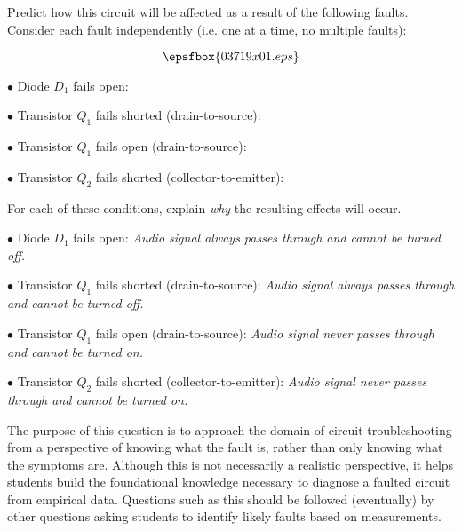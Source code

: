 

Predict how this circuit will be affected as a result of the following faults.  Consider each fault independently (i.e. one at a time, no multiple faults):

$$\epsfbox{03719x01.eps}$$

\medskip
\item{$\bullet$} Diode $D_1$ fails open:
\vskip 5pt
\item{$\bullet$} Transistor $Q_1$ fails shorted (drain-to-source):
\vskip 5pt
\item{$\bullet$} Transistor $Q_1$ fails open (drain-to-source):
\vskip 5pt
\item{$\bullet$} Transistor $Q_2$ fails shorted (collector-to-emitter):
\medskip

For each of these conditions, explain {\it why} the resulting effects will occur.







\medskip
\item{$\bullet$} Diode $D_1$ fails open: {\it Audio signal always passes through and cannot be turned off.}
\vskip 5pt
\item{$\bullet$} Transistor $Q_1$ fails shorted (drain-to-source): {\it Audio signal always passes through and cannot be turned off.}
\vskip 5pt
\item{$\bullet$} Transistor $Q_1$ fails open (drain-to-source): {\it Audio signal never passes through and cannot be turned on.}
\vskip 5pt
\item{$\bullet$} Transistor $Q_2$ fails shorted (collector-to-emitter): {\it Audio signal never passes through and cannot be turned on.}
\medskip







The purpose of this question is to approach the domain of circuit troubleshooting from a perspective of knowing what the fault is, rather than only knowing what the symptoms are.  Although this is not necessarily a realistic perspective, it helps students build the foundational knowledge necessary to diagnose a faulted circuit from empirical data.  Questions such as this should be followed (eventually) by other questions asking students to identify likely faults based on measurements.




